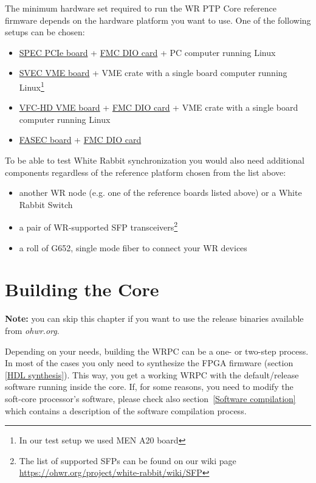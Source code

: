 \documentclass[a4paper, 12pt]{article}
\renewcommand{\_}{\underscore\allowbreak}
\begin{document}
The minimum hardware set required to run the WR PTP Core reference firmware
depends on the hardware platform you want to use. One of the following setups
can be chosen:
\begin{itemize}
\item \href{https://ohwr.org/project/spec}{SPEC PCIe board} +
  \href{https://ohwr.org/project/fmc-dio-5chttla}{FMC DIO card} + PC
  computer running Linux
\item \href{https://ohwr.org/project/svec}{SVEC VME board} + VME crate with
  a single board computer running Linux\footnote{\label{note_a20}In our test setup
    we used MEN A20 board}
\item \href{https://ohwr.org/project/vfc-hd}{VFC-HD VME board} +
  \href{https://ohwr.org/project/fmc-dio-5chttla}{FMC DIO card} +
  VME crate with a single board computer running Linux
\item \href{https://ohwr.org/project/fasec}{FASEC board} +
  \href{https://ohwr.org/project/fmc-dio-5chttla}{FMC DIO card}
\end{itemize}

To be able to test White Rabbit synchronization you would also need
additional components regardless of the reference platform chosen from the list
above:
\begin{itemize}
  \item another WR node (e.g. one of the reference boards listed above) or a
    White Rabbit Switch
  \item a pair of WR-supported SFP transceivers\footnote{The list of supported
    SFPs can be found on our wiki page
    \url{https://ohwr.org/project/white-rabbit/wiki/SFP}}
  \item a roll of G652, single mode fiber to connect your WR devices
\end{itemize}

\newpage
\section{Building the Core}
\label{Building the Core}

\textbf{Note:} you can skip this chapter if you want to use the release binaries
available from \textit{ohwr.org}.

\vspace{1em}
Depending on your needs, building the WRPC can be a one- or two-step process.
In most of the cases you only need to synthesize the FPGA firmware (section
\ref{HDL synthesis}). This way, you get a working WRPC with the default/release
software running inside the core. If, for some reasons, you need to modify
the soft-core processor's software, please check also
section~\ref{Software compilation}
which contains a description of the software compilation process.
\end{document}
